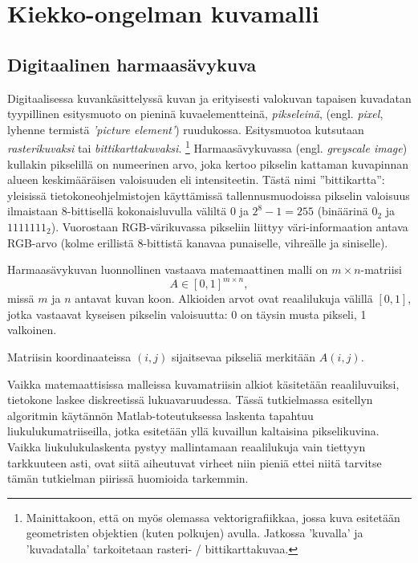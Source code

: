 \chapter{Kiekko-ongelman kuvamalli}
\label{cha:kuvamalli_ja_aineisto}

\section{Digitaalinen harmaasävykuva}
\label{sec:digitaalinen_kuva}

Digitaalisessa kuvankäsittelyssä kuvan ja erityisesti valokuvan tapaisen kuvadatan tyypillinen esitysmuoto on pieninä kuvaelementteinä, \emph{pikseleinä}, (engl. \emph{pixel}, lyhenne termistä \emph{'picture element'}) ruudukossa.
Esitysmuotoa kutsutaan \emph{rasterikuvaksi} tai \emph{bittikarttakuvaksi}.
\footnote{Mainittakoon, että on myös olemassa vektorigrafiikkaa, jossa kuva esitetään geometristen objektien (kuten polkujen) avulla.
Jatkossa 'kuvalla' ja 'kuvadatalla' tarkoitetaan rasteri- / bittikarttakuvaa.}
Harmaasävykuvassa (engl. \emph{greyscale image}) kullakin pikselillä on numeerinen arvo, joka kertoo pikselin kattaman kuvapinnan alueen keskimääräisen valoisuuden eli intensiteetin.
Tästä nimi ''bittikartta'':
yleisissä tietokoneohjelmistojen käyttämissä tallennusmuodoissa pikselin valoisuus ilmaistaan 8-bittisellä kokonaisluvulla väliltä $0$ ja $2^8 -1 = 255$ (binäärinä $0_2$ ja $1111111_2$).
Vuorostaan RGB-värikuvassa pikseliin liittyy väri-informaation antava RGB-arvo (kolme erillistä 8-bittistä kanavaa punaiselle, vihreälle ja siniselle).

Harmaasävykuvan luonnollinen vastaava matemaattinen malli on $m \times n$-matriisi
\begin{equation}
    A \in [0, 1]^{m \times n},
\end{equation}
missä $m$ ja $n$ antavat kuvan koon.
Alkioiden arvot ovat reaalilukuja välillä $[0, 1]$, jotka vastaavat kyseisen pikselin valoisuutta: 0 on täysin musta pikseli, 1 valkoinen.
\cite[29--32]{jähne}

Matriisin koordinaateissa $(i,j)$ sijaitsevaa pikseliä merkitään $A(i,j)$.

Vaikka matemaattisissa malleissa kuvamatriisin alkiot käsitetään reaaliluvuiksi, tietokone laskee diskreetissä lukuavaruudessa.
Tässä tutkielmassa esitellyn algoritmin käytännön Matlab-toteutuksessa laskenta tapahtuu liukulukumatriiseilla, jotka esitetään yllä kuvaillun kaltaisina pikselikuvina.
Vaikka liukulukulaskenta pystyy mallintamaan reaalilukuja vain tiettyyn tarkkuuteen asti,
ovat siitä aiheutuvat virheet niin pieniä ettei niitä tarvitse tämän tutkielman piirissä huomioida tarkemmin.


